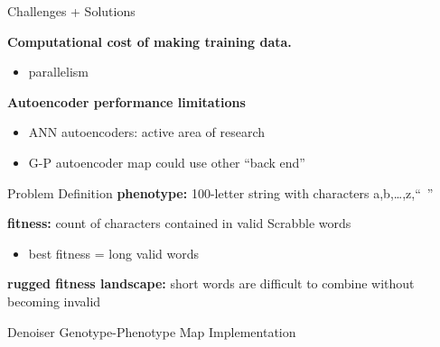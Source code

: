 \begin{frame}{Challenges + Solutions}

\textbf{Computational cost of making training data.}
\pause
\vspace{-1ex}
\begin{itemize}[<+->]
\itemsep0em
\item parallelism
\end{itemize}
\vspace{-1ex}
\pause


\textbf{Autoencoder performance limitations}
\pause
\vspace{-1ex}
\begin{itemize}[<+->]
\itemsep0em
\item ANN autoencoders: active area of research
\item G-P autoencoder map could use other ``back end''
\end{itemize}

\end{frame}

\begin{frame}{Problem Definition}
\textbf{phenotype:} 100-letter string with characters a,b,\dots,z,``~''
\vspace{2ex}
\pause

\textbf{fitness:} count of characters contained in valid Scrabble words
\begin{itemize}
\item best fitness = long valid words
\end{itemize}

\vspace{2ex}
\pause

\textbf{rugged fitness landscape:}
short words are difficult to combine without becoming invalid

\end{frame}

\begin{frame}{Denoiser Genotype-Phenotype Map Implementation}



\end{frame}

